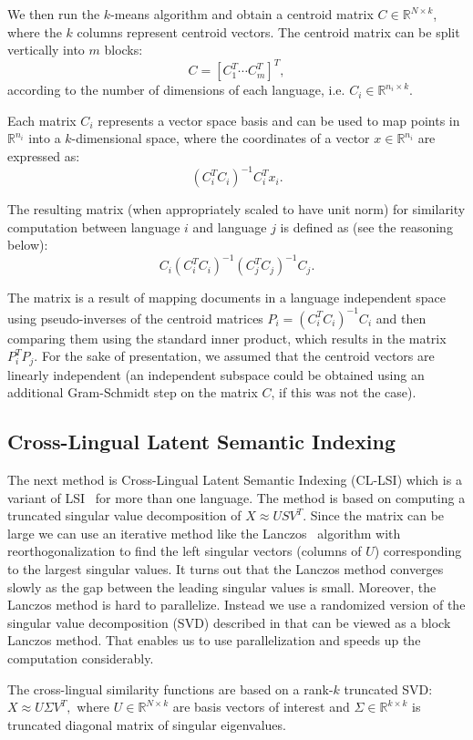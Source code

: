 \documentclass[twoside,11pt]{article}
\newcommand{\RR}{\mathbb{R}}
\begin{document}
We then run the $k$-means algorithm \cite{kmeans} and obtain a centroid matrix $C \in \RR^{N \times k}$, where the $k$ columns represent centroid vectors. The centroid matrix can be split vertically into $m$ blocks: $$C = [C_1^T \cdots C_m^T]^T,$$ according to the number of dimensions of each language, i.e. $C_i \in \RR^{n_i \times k}$.

Each matrix $C_i$ represents a vector space basis and can be used to map points in $\RR^{n_i}$ into a $k$-dimensional space, where the coordinates of a vector $x \in \RR^{n_i}$ are expressed as: $$(C_i^T C_i)^{-1} C_i^T x_i.$$

The resulting matrix (when appropriately scaled to have unit norm) for similarity computation between language $i$ and language $j$ is defined as (see the reasoning below):
$$C_i(C_i^T C_i)^{-1} (C_j^T C_j)^{-1} C_j.$$

The matrix is a result of mapping documents in a language independent space using pseudo-inverses of the centroid matrices $P_i = (C_i^T C_i)^{-1} C_i$ and then comparing them using the standard inner product, which results in the matrix $P_i^T P_j$. For the sake of presentation, we assumed that the centroid vectors are linearly independent (an independent subspace could be obtained using an additional Gram-Schmidt step on the matrix $C$, if this was not the case).

\subsection{Cross-Lingual Latent Semantic Indexing}

The next method is Cross-Lingual Latent Semantic Indexing (CL-LSI)\cite{cl_lsi} which is a variant of LSI~\cite{lsi} for more than one language. The method is based on computing a truncated singular value decomposition of $X \approx U S V^T$. Since the matrix can be large we can use an iterative method like the Lanczos~\cite{golub} algorithm with reorthogonalization to find the left singular vectors (columns of $U$) corresponding to the largest singular values. It turns out that the Lanczos method converges slowly as the gap between the leading singular values is small. Moreover, the Lanczos method is hard to parallelize. Instead we use a randomized version of the singular value decomposition (SVD) described in \cite{tropp} that can be viewed as a block Lanczos method. That enables us to use parallelization and speeds up the computation considerably.

The cross-lingual similarity functions are based on a rank-$k$ truncated SVD: $X \approx U \Sigma V^T,$ where $U \in \RR^{N \times k}$ are basis vectors of interest and $\Sigma \in \RR^{k \times k}$ is truncated diagonal matrix of singular eigenvalues.
\end{document}
